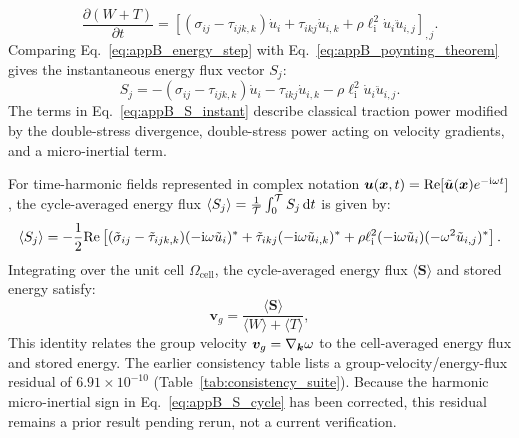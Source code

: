 \begin{equation}
\frac{\partial (W + T)}{\partial t} = \left[ (\sigma_{ij} - \tau_{ijk,k}) \dot{u}_i + \tau_{ikj} \dot{u}_{i,k} + \rho \ell_{\mathrm{i}}^2 \dot{u}_i \ddot{u}_{i,j} \right]_{,j}.
\label{eq:appB_energy_step}
\end{equation}
Comparing Eq.~\eqref{eq:appB_energy_step} with Eq.~\eqref{eq:appB_poynting_theorem} gives the instantaneous energy flux vector $S_j$:
\begin{equation}
S_j = -(\sigma_{ij} - \tau_{ijk,k}) \dot{u}_i - \tau_{ikj} \dot{u}_{i,k} - \rho \ell_{\mathrm{i}}^2 \dot{u}_i \ddot{u}_{i,j}.
\label{eq:appB_S_instant}
\end{equation}
The terms in Eq.~\eqref{eq:appB_S_instant} describe classical traction power modified by the double-stress divergence, double-stress power acting on velocity gradients, and a micro-inertial term.

For time-harmonic fields represented in complex notation $\bm{u}(\bm{x}, t) = \mathrm{Re}[\tilde{\bm{u}}(\bm{x}) e^{-\mathrm{i} \omega t}]$, the cycle-averaged energy flux $\langle S_j \rangle = \frac{1}{\mathcal{T}}\int_0^{\mathcal{T}} S_j\,\mathrm{d} t$ is given by:
\begin{equation}
\langle S_j \rangle = -\frac{1}{2} \mathrm{Re} \left[ (\tilde{\sigma}_{ij} - \tilde{\tau}_{ijk,k}) (-\mathrm{i} \omega \tilde{u}_i)^* + \tilde{\tau}_{ikj} (-\mathrm{i} \omega \tilde{u}_{i,k})^* + \rho \ell_{\mathrm{i}}^2 (-\mathrm{i} \omega \tilde{u}_i) (-\omega^2 \tilde{u}_{i,j})^* \right].
\label{eq:appB_S_cycle}
\end{equation}
Integrating over the unit cell $\Omega_{\mathrm{cell}}$, the cycle-averaged energy flux $\langle \bm{S} \rangle$ and stored energy satisfy:
\begin{equation}
\bm{v}_g = \frac{\langle \bm{S} \rangle}{\langle W \rangle + \langle T \rangle},
\label{eq:appB_vg_identity}
\end{equation}
This identity relates the group velocity $\bm{v}_g = \nabla_{\bm{k}}\omega$ to the cell-averaged energy flux and stored energy. The earlier consistency table lists a group-velocity/energy-flux residual of $6.91\times10^{-10}$ (Table~\ref{tab:consistency_suite}). Because the harmonic micro-inertial sign in Eq.~\eqref{eq:appB_S_cycle} has been corrected, this residual remains a prior result pending rerun, not a current verification.
